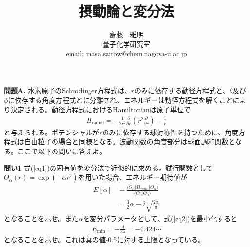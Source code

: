 \documentclass[11pt,pra,aps]{revtex4}
\begin{document}
\title{摂動論と変分法}
\author{齋藤　雅明 \\ 量子化学研究室 \\ email: masa.saitow@chem.nagoya-u.ac.jp}

\maketitle

\noindent
{\bf 問題A.} 水素原子のSchr\"odinger方程式は、$r$のみに依存する動径方程式と、$\theta$及び$\phi$に依存する角度方程式とに分離され、エネルギーは動径方程式を解くことにより決定される。動径方程式におけるHamiltonianは原子単位で
\begin{align}
  H_\text{radial}=-\frac{1}{2r^2}\frac{\partial}{\partial r}\left(r^2 \frac{\partial}{\partial r}\right) - \frac{1}{r} \label{eq1}
\end{align}
と与えられる。ポテンシャルが$r$のみに依存する球対称性を持つために、角度方程式は自由粒子の場合と同様となる。波動関数の角度部分は球面調和関数となる。ここで以下の問いに答えよ。

\noindent
{\bf 問い1} 式(\ref{eq1})の固有値を変分法で近似的に求める。試行関数として$\Theta_\alpha(r)=\exp(-\alpha r^2)$を用いた場合、エネルギー期待値が
\begin{align}
  E[\alpha] &= \frac{\langle\Theta_\alpha|H_\text{radial}|\Theta_\alpha\rangle}{\langle\Theta_\alpha|\Theta_\alpha\rangle} \\ \nonumber
            &= \frac{3}{2}\alpha - 2\sqrt{\frac{2\alpha}{\pi}} \label{eq2}
\end{align}
となることを示せ。また$\alpha$を変分パラメータとして、式(\ref{eq2})を最小化すると
\begin{align}
  E_\text{min}=-\frac{4}{3\pi}=-0.424\cdots
\end{align}
となることを示せ。これは真の値-0.5に対する上限となっている。
\end{document}
